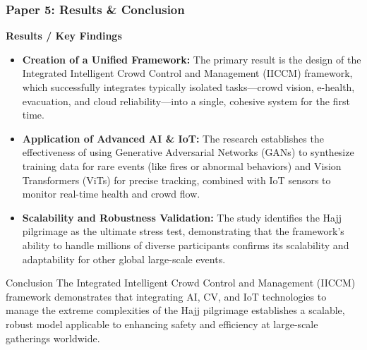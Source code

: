 \documentclass{beamer}
\begin{document}
\begin{frame}
\frametitle{Paper 5: Results \& Conclusion}
\scriptsize

\textbf{Results / Key Findings}
\begin{itemize}
    \item \textbf{Creation of a Unified Framework:} The primary result is the design of the Integrated Intelligent Crowd Control and Management (IICCM) framework, which successfully integrates typically isolated tasks—crowd vision, e-health, evacuation, and cloud reliability—into a single, cohesive system for the first time.
    \item \textbf{Application of Advanced AI \& IoT:} The research establishes the effectiveness of using Generative Adversarial Networks (GANs) to synthesize training data for rare events (like fires or abnormal behaviors) and Vision Transformers (ViTs) for precise tracking, combined with IoT sensors to monitor real-time health and crowd flow.
    \item \textbf{Scalability and Robustness Validation:} The study identifies the Hajj pilgrimage as the ultimate stress test, demonstrating that the framework’s ability to handle millions of diverse participants confirms its scalability and adaptability for other global large-scale events.
\end{itemize}

\begin{alertblock}{Conclusion}
The Integrated Intelligent Crowd Control and Management (IICCM) framework demonstrates that integrating AI, CV, and IoT technologies to manage the extreme complexities of the Hajj pilgrimage establishes a scalable, robust model applicable to enhancing safety and efficiency at large-scale gatherings worldwide.
\end{alertblock}
\end{frame}

\end{document}
